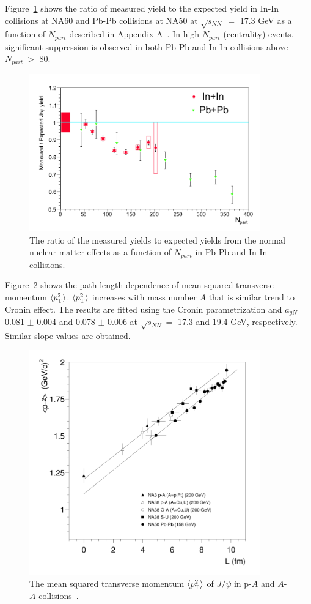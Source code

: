 Figure~\ref{fig_2_inin} shows the ratio of measured yield to the expected yield in In-In collisions at NA60 and Pb-Pb collisions at NA50 at $\sqrt{s_{NN}}~=$ 17.3 GeV as a function of $N_{part}$ described in Appendix A~\cite{bib_2_na60aa}. 
In high $N_{part}$ (centrality) events, significant suppression is observed in both Pb-Pb and In-In collisions above $N_{part}~>$ 80. 
\begin{figure}[!h]
  \centering
  \includegraphics[width=10cm]{chap2/figure/experimentaldata/sps_ininpbpb.png}
  \caption{The ratio of the measured yields to expected yields from the normal nuclear matter effects as a function of $N_{part}$ in Pb-Pb and In-In collisions\cite{bib_2_na60aa}. }
  \label{fig_2_inin}
\end{figure}

Figure~\ref{fig_2_spsmeanpt} shows the path length dependence of mean squared transverse momentum  $\langle p_{\rm{T}}^{2}\rangle$\cite{bib_2_na50aa4}. 
$\langle p_{\rm{T}}^{2}\rangle$ increases with mass number $A$ that is similar trend to Cronin effect. 
The results are fitted using the Cronin parametrization and $a_{gN} = $0.081 $\pm$ 0.004 and 0.078 $\pm$ 0.006 at $\sqrt{s_{NN}} = $ 17.3 and 19.4 GeV, respectively. Similar slope values are obtained. 
\begin{figure}[!h]
  \centering
  \includegraphics[width=10cm]{chap2/figure/experimentaldata/sps_meanpt.png}
  \caption{The mean squared transverse momentum $\langle p_{\rm{T}}^{2}\rangle$ of $J/\psi$ in p-$A$ and $A$-$A$ collisions~\cite{bib_2_na50aa4}. }
  \label{fig_2_spsmeanpt}
\end{figure}

